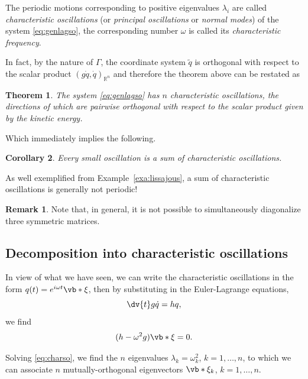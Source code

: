 \documentclass[english,fontsize=11pt,paper=b5]{scrbook}
\newtheorem{theorem}{Theorem}[chapter]
\newtheorem{corollary}[theorem]{Corollary}
\theoremstyle{definition}
\newtheorem{remark}{Remark}[chapter]
\begin{document}
    \begin{tcolorbox}
      The periodic motions corresponding to positive eigenvalues $\lambda_i$ are called \emph{characteristic oscillations} (or \emph{principal oscillations} or \emph{normal modes}) of the system \eqref{eq:genlagso}, the corresponding number $\omega$ is called its \emph{characteristic frequency}.
    \end{tcolorbox}

    In fact, by the nature of $\Gamma$, the coordinate system $\widetilde q$ is orthogonal with respect to the scalar product $(g\dot q, \dot q)_{\mathbb{R}^n}$ and therefore the theorem above can be restated as
    \begin{theorem}
      The system \eqref{eq:genlagso} has $n$ characteristic oscillations, the directions of which are pairwise orthogonal with respect to the scalar product given by the kinetic energy.
    \end{theorem}

    Which immediately implies the following.

    \begin{corollary}
      Every small oscillation is a sum of characteristic oscillations.
    \end{corollary}

    As well exemplified from Example~\ref{exa:lissajous}, a sum of characteristic oscillations is generally not periodic!

    \begin{remark}
      Note that, in general, it is not possible to simultaneously diagonalize three symmetric matrices.
    \end{remark}

    \subsection{Decomposition into characteristic oscillations}\label{eq:decomposition}

    In view of what we have seen, we can write the characteristic oscillations in the form $q(t) = e^{i\omega t} \vb*{\xi}$, then by substituting in the Euler-Lagrange equations,
    \begin{equation}
      \dv{t} g \dot q = h q,
    \end{equation}
    we find
    \begin{equation}
      (h - \omega^2 g)\vb*{\xi} = 0.
    \end{equation}

    Solving \eqref{eq:charso}, we find the $n$ eigenvalues $\lambda_k = \omega_k^2$, $k=1, \ldots, n$, to which we can associate $n$ mutually-orthogonal eigenvectors $\vb*{\xi}_k$, $k=1, \ldots, n$.
\end{document}
